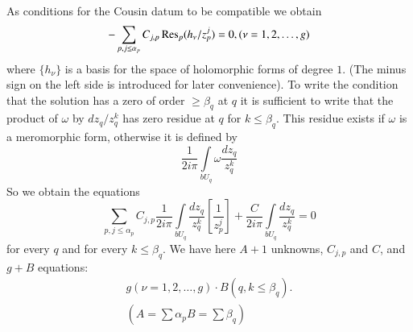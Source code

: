 As conditions for the Cousin datum to be compatible we obtain
$$
-\sum_{p,j\leq\alpha_{p}}C_{j,p}\operatorname{Res}_{p}(h_{\nu}/z^{j}_{p})=0,(\nu=1,2,\ldots,g)
$$
where $\{h_{\nu}\}$ is a basis for the space of holomorphic forms of
degree $1$. (The minus sign on the left side is introduced for later
convenience). To write the condition that the solution has a zero of
order $\geq \beta_{q}$ at $q$ it is sufficient to write that the
product of $\omega$ by $dz_{q}/z^{k}_{q}$ has zero residue at $q$ for
$k\leq \beta_{q}$. This residue exists if $\omega$ is a meromorphic
form, otherwise it is defined by
$$
\frac{1}{2i\pi}\int\limits_{bU_{q}}\omega \frac{dz_{q}}{z^{k}_{q}}
$$
So we obtain the equations
$$
\sum_{p,j\leq
  \alpha_{p}}C_{j,p}\frac{1}{2i\pi}\int\limits_{bU_{q}}\frac{dz_{q}}{z^{k}_{q}}[\frac{1}{z^{j}_{p}}]+\frac{C}{2i\pi}\int\limits_{bU_{q}}\frac{dz_{q}}{z^{k}_{q}}=0 
$$
for every $q$ and for every $k\leq\beta_{q}$. We have here $A+1$
unknowns, $C_{j,p}$ and $C$, and $g+B$ equations:
\begin{gather*}
g(\nu=1,2,\ldots,g)\cdot B(q,k\leq \beta_{q}).\\
\left(A=\sum\alpha_{p}B=\sum\beta_{q}\right)
\end{gather*}

